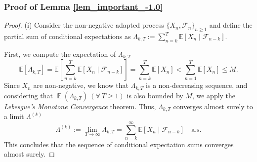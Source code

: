 \documentclass{article} %
\DeclareMathOperator{\Expect}{\mathbb{E}}
\begin{document}
\subsubsection{Proof of Lemma \ref{lem_important_-1.0}}
\begin{proof}

(i) Consider the non-negative adapted process \(\{X_n, \mathscr{F}_n\}_{n \geq 1}\) and define the partial sum of conditional expectations as \(\Lambda_{k,T} := \sum_{n=k}^{T} \mathbb{E}[X_n \mid \mathscr{F}_{n-k}]\). 

First, we compute the expectation of \(\Lambda_{k,T}\)
\[
\mathbb{E}[\Lambda_{k,T}] = \mathbb{E}\left[\sum_{n=k}^{T} \mathbb{E}[X_n \mid \mathscr{F}_{n-k}]\right] = \sum_{n=k}^{T} \mathbb{E}[X_n]< \sum_{n=1}^{T} \mathbb{E}[X_n]\leq M.
\]
Since \(X_n\) are non-negative, we know that \(\Lambda_{k,T}\) is a non-decreasing sequence, and considering that \(\Expect(\Lambda_{k,T})\ (\forall\ T\ge 1)\) is also bounded by $M$, we apply the \emph{Lebesgue's Monotone Convergence} theorem. Thus, \(\Lambda_{k,T}\) converges almost surely to a limit \(\Lambda^{(k)}\)
\[
\Lambda^{(k)} := \lim_{T \to \infty} \Lambda_{k,T} = \sum_{n=k}^{\infty} \mathbb{E}[X_n \mid \mathscr{F}_{n-k}] \quad \text{a.s.}
\]
This concludes that the sequence of conditional expectation sums converges almost surely.


\end{proof}
\end{document}
